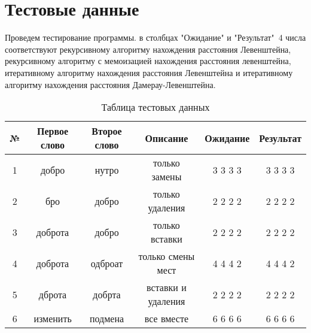 \section{Тестовые данные}

\par
Проведем тестирование программы. в столбцах "Ожидание" и "Результат"~4 числа соответствуют рекурсивному алгоритму нахождения расстояния Левенштейна, рекурсивному алгоритму с мемоизацией нахождения расстояния левенштейна, итеративному алгоритму нахождения расстояния Левенштейна и итеративному алгоритму нахождения расстояния Дамерау-Левенштейна.

\begin{table} [h!]
\caption{Таблица тестовых данных}
	\begin{tabular}{|c c c c c c|} 
 	\hline
    № & Первое слово & Второе слово & Описание & Ожидание & Результат \\ [0.8ex] 
 	\hline\hline
    1 & добро & нутро & только замены & 3 3 3 3 & 3 3 3 3\\
 	\hline
    2 & бро & добро & только удаления & 2 2 2 2 & 2 2 2 2\\
 	\hline
    3 & доброта & добро & только вставки & 2 2 2 2 & 2 2 2 2\\
	\hline
    4 & доброта & одброат & только смены мест & 4 4 4 2 & 4 4 4 2\\
	\hline
    5 & дброта & добрта & вставки и удаления & 2 2 2 2 & 2 2 2 2\\
	\hline
    6 & изменить & подмена & все вместе & 6 6 6 6 & 6 6 6 6\\
	\hline
	\end{tabular}
\end{table}




